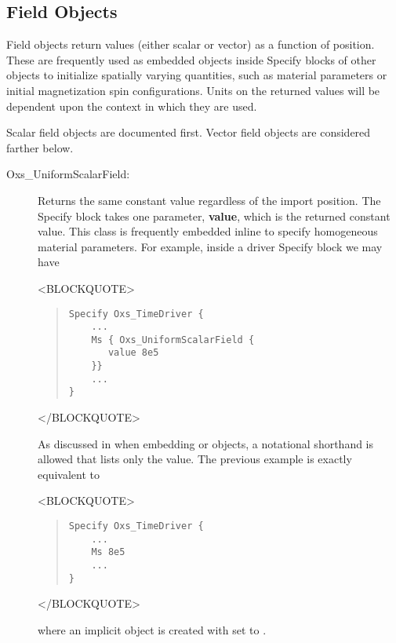 \subsection{Field Objects\label{sec:oxsFieldObjects}}
Field objects return values (either scalar or vector) as a function of
position.  These are frequently used as embedded objects inside Specify
blocks of other  objects to initialize spatially varying
quantities, such as material parameters or initial magnetization spin
configurations.  Units on the returned values will be dependent upon the
context in which they are used.

Scalar field objects are documented first.  Vector field objects are
considered farther below.
\begin{description}
\item[Oxs\_UniformScalarField:\label{item:UniformScalarField}]
%
   Returns the same constant value regardless of the import position.
   The Specify block takes one parameter, \textbf{value}, which is the
   returned constant value.  This class is frequently embedded inline to
   specify homogeneous material parameters.  For example, inside a driver
   Specify block we may have
\begin{rawhtml}
<BLOCKQUOTE>
\end{rawhtml}
\begin{quote}
\begin{verbatim}
Specify Oxs_TimeDriver {
    ...
    Ms { Oxs_UniformScalarField {
       value 8e5
    }}
    ...
}
\end{verbatim}
\end{quote}
\begin{rawhtml}
</BLOCKQUOTE>
\end{rawhtml}
As discussed in
when embedding 
or 
objects, a notational shorthand is allowed that lists only the value.
The previous example is exactly equivalent to
\begin{rawhtml}
<BLOCKQUOTE>
\end{rawhtml}
\begin{quote}
\begin{verbatim}
Specify Oxs_TimeDriver {
    ...
    Ms 8e5
    ...
}
\end{verbatim}
\end{quote}
\begin{rawhtml}
</BLOCKQUOTE>
\end{rawhtml}
where an implicit  object is
created with  set to .


\end{description}
